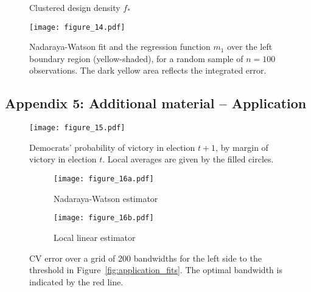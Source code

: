 \vfill
\begin{figure}
	\centering
	\caption{Clustered design density $f_{\ast}$}
	\label{fig:clustered_design_density}
\end{figure}

\begin{figure}
	\centering
	\texttt{[image: figure\_14.pdf]}
	\caption{Nadaraya-Watson fit and the regression function $m_1$ over the left boundary region (yellow-shaded),
			 for a random sample of $n = 100$ observations.
			 The dark yellow area reflects the integrated error.}
	\label{fig:simulation_set-up}
\end{figure}

\clearpage

\subsection*{Appendix 5: Additional material -- Application}
\vfill
\begin{figure}[h]
	\centering
	\texttt{[image: figure\_15.pdf]}
	\caption{Democrats' probability of victory in election $t+1$, by margin of victory in election $t$.
			 Local averages are given by the filled circles.}
	\label{fig:application_overview}
\end{figure}
\vfill
\begin{figure}
	\centering
	\begin{subfigure}{0.75\textwidth}
		\centering
		\texttt{[image: figure\_16a.pdf]}
		\caption{Nadaraya-Watson estimator}
		\label{fig:application_left_nw}
	\end{subfigure}

	\begin{subfigure}{0.75\textwidth}
		\centering
		\texttt{[image: figure\_16b.pdf]}
		\caption{Local linear estimator}
		\label{fig:application_left_ll}
	\end{subfigure}
	\caption{CV error over a grid of 200 bandwidths for the left side to the threshold in Figure~\ref{fig:application_fits}.
			 The optimal bandwidth is indicated by the red line.}
	\label{fig:application_left}
\end{figure}

